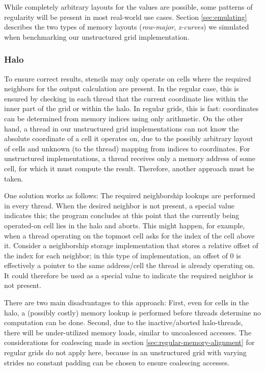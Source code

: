 While completely arbitrary layouts for the values are possible, some patterns of regularity will be present in most real-world use cases. Section \ref{sec:emulating} describes the two types of memory layouts (\emph{row-major}, \emph{z-curves}) we simulated when benchmarking our unstructured grid implementation.

\subsubsection{Halo}

To ensure correct results, stencils may only operate on cells where the required neighbors for the output calculation are present. In the regular case, this is ensured by checking in each thread that the current coordinate lies within the inner part of the grid or within the halo. In regular grids, this is fast: coordinates can be determined from memory indices using only arithmetic. On the other hand, a thread in our unstructured grid implementations can not know the absolute coordinate of a cell it operates on, due to the possibly arbitrary layout of cells and unknown (to the thread) mapping from indices to coordinates. For unstructured implementations, a thread receives only a memory address of some cell, for which it must compute the result. Therefore, another approach must be taken.

One solution works as follows: The required neighborship lookups are performed in every thread. When the desired neighbor is not present, a special value indicates this; the program concludes at this point that the currently being operated-on cell lies in the halo and aborts. This might happen, for example, when a thread operating on the topmost cell asks for the index of the cell above it. Consider a neighborship storage implementation that stores a relative offset of the index for each neighbor; in this type of implementation, an offset of $0$ is effectively a pointer to the same address/cell the thread is already operating on. It could therefore be used as a special value to indicate the required neighbor is not present.

There are two main disadvantages to this approach: First, even for cells in the halo, a (possibly costly) memory lookup is performed before threads determine no computation can be done. Second, due to the inactive/aborted halo-threads, there will be under-utilized memory loads, similar to uncoalesced accesses. The considerations for coalescing made in section \ref{sec:regular-memory-alignment} for regular grids do not apply here, because  in an unstructured grid with varying strides no constant padding can be chosen to ensure coalescing accesses. 

